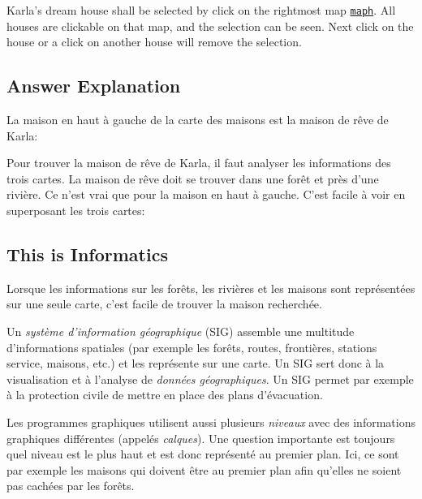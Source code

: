 \documentclass[a4paper,11pt]{report}
\newcommand{\BrochureUrlText}[1]{\texttt{#1}}
\newcommand{\taskGraphicsFolder}{..}
\begin{document}
Karla’s dream house shall be selected by click on the rightmost map \href{graphics/-fra_ita/2023-DE-04-Map_Houses-compatible.svg}{\BrochureUrlText{maph}}. All houses are clickable on that map, and the selection can be seen. Next click on the house or a click on another house will remove the selection.

\endgroup

\subsection*{Answer Explanation}

La maison en haut à gauche de la carte des maisons est la maison de rêve de Karla:

{\centering%
\par}

Pour trouver la maison de rêve de Karla, il faut analyser les informations des trois cartes. La maison de rêve doit se trouver dans une forêt et près d’une rivière. Ce n’est vrai que pour la maison en haut à gauche. C’est facile à voir en superposant les trois cartes:

{\centering%
\par}


\subsection*{This is Informatics}

Lorsque les informations sur les forêts, les rivières et les maisons sont représentées sur une seule carte, c’est facile de trouver la maison recherchée.

Un \emph{système d’information géographique} (SIG) assemble une multitude d’informations spatiales (par exemple les forêts, routes, frontières, stations service, maisons, etc.) et les représente sur une carte. Un SIG sert donc à la visualisation et à l’analyse de \emph{données géographiques}. Un SIG permet par exemple à la protection civile de mettre en place des plans d’évacuation.

Les programmes graphiques utilisent aussi plusieurs \emph{niveaux} avec des informations graphiques différentes (appelés \emph{calques}). Une question importante est toujours quel niveau est le plus haut et est donc représenté au premier plan. Ici, ce sont par exemple les maisons qui doivent être au premier plan afin qu’elles ne soient pas cachées par les forêts.
\end{document}
